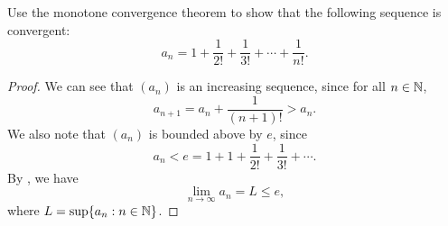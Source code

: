 \begin{problem}
  Use the monotone convergence theorem to show that the following sequence is convergent:
  \[
    a_{n} = 1 + \frac{1}{2!} + \frac{1}{3!} + \cdots + \frac{1}{n!}.
  \]

  \begin{proof}
    We can see that $(a_{n})$ is an increasing sequence, since for all $n \in \mathbb{N}$,
    \[
      a_{n+1} = a_{n} + \frac{1}{(n+1)!} > a_{n}.
    \]
    We also note that $(a_{n})$ is bounded above by $e$, since
    \[
      a_{n} < e = 1 + 1 + \frac{1}{2!} + \frac{1}{3!} + \cdots.
    \]
    By , we have
    \[
      \lim_{n \to \infty} a_{n} = L \leq e,
    \]
    where $L = \sup \{ a_{n} : n \in \mathbb{N}\}$.
  \end{proof}
\end{problem}

